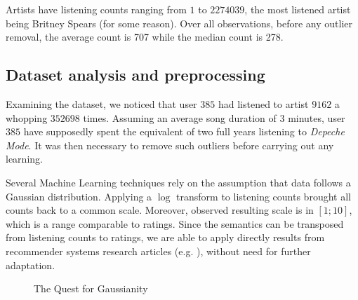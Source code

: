 \documentclass[10pt,a4paper]{article}
\begin{document}
  Artists have listening counts ranging from $1$ to $2274039$, the most listened artist being Britney Spears (for some reason). Over all observations, before any outlier removal, the average count is 707 while the median count is 278.\\

  \subsection{Dataset analysis and preprocessing}
  Examining the dataset, we noticed that user $385$ had listened to artist $9162$ a whopping $352698$ times. Assuming an average song duration of $3$ minutes, user $385$ have supposedly spent the equivalent of two full years listening to \textit{Depeche Mode}. It was then necessary to remove such outliers before carrying out any learning.

  Several Machine Learning techniques rely on the assumption that data follows a Gaussian distribution. Applying a $\log$ transform to listening counts brought all counts back to a common scale. Moreover, observed resulting scale is in $[1;10]$, which is a range comparable to ratings. Since the semantics can be transposed from listening counts to ratings, we are able to apply directly results from recommender systems research articles (e.g. \cite{alswr}), without need for further adaptation.

  \begin{figure}[ht]
    \center
    \caption{The Quest for Gaussianity}
    \label{fig:recommendation-normalization}
  \end{figure}
\end{document}
